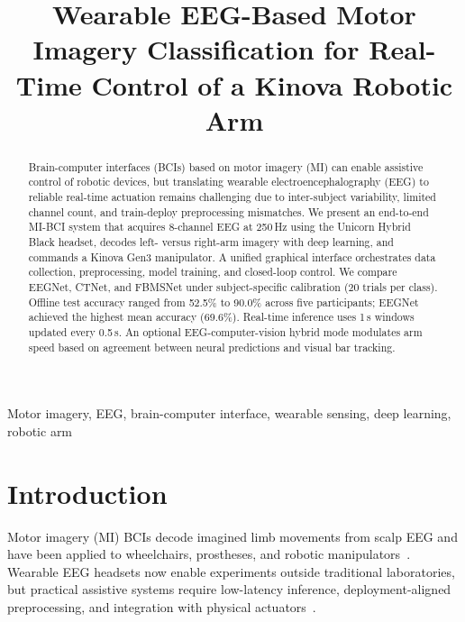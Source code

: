 \documentclass[conference]{IEEEtran}
\begin{document}
\title{Wearable EEG-Based Motor Imagery Classification for Real-Time Control of a Kinova Robotic Arm}

\author{
}

\maketitle

\begin{abstract}
Brain-computer interfaces (BCIs) based on motor imagery (MI) can enable assistive control of robotic devices, but translating wearable electroencephalography (EEG) to reliable real-time actuation remains challenging due to inter-subject variability, limited channel count, and train-deploy preprocessing mismatches. We present an end-to-end MI-BCI system that acquires 8-channel EEG at 250\,Hz using the Unicorn Hybrid Black headset, decodes left- versus right-arm imagery with deep learning, and commands a Kinova Gen3 manipulator. A unified graphical interface orchestrates data collection, preprocessing, model training, and closed-loop control. We compare EEGNet, CTNet, and FBMSNet under subject-specific calibration (20 trials per class). Offline test accuracy ranged from 52.5\% to 90.0\% across five participants; EEGNet achieved the highest mean accuracy (69.6\%). Real-time inference uses 1\,s windows updated every 0.5\,s. An optional EEG-computer-vision hybrid mode modulates arm speed based on agreement between neural predictions and visual bar tracking.
\end{abstract}

\begin{IEEEkeywords}
Motor imagery, EEG, brain-computer interface, wearable sensing, deep learning, robotic arm
\end{IEEEkeywords}

\section{Introduction}
Motor imagery (MI) BCIs decode imagined limb movements from scalp EEG and have been applied to wheelchairs, prostheses, and robotic manipulators~\cite{pfurtscheller1997,pfurtscheller2006,ang2008}. Wearable EEG headsets now enable experiments outside traditional laboratories, but practical assistive systems require low-latency inference, deployment-aligned preprocessing, and integration with physical actuators~\cite{lotte2018}.
\end{document}
